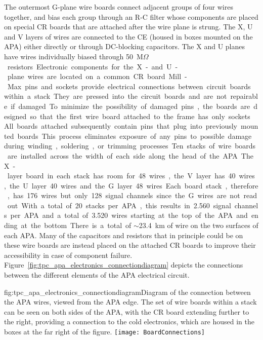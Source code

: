 The outermost G-plane wire boards connect adjacent groups of four wires together, and bias each group through an R-C filter whose components are placed on special CR boards that are attached after the wire plane is strung. The X, U and V layers of wires are connected to the CE (housed in boxes mounted on the APA) either directly or through DC-blocking capacitors. The X and U planes have wires individually biased through \SI{50}{M$\Omega$} resistors. Electronic components for the X- and U-plane wires are located on a common CR board. 

Mill-Max pins and sockets provide electrical connections between circuit boards within a stack. They are pressed into the circuit boards and are not repairable if damaged. To minimize the possibility of damaged pins, the boards are designed so that the first wire board attached to the frame has only sockets. All boards attached subsequently contain pins that plug into previously mounted boards. This process eliminates exposure of any pins to possible damage during winding, soldering, or trimming processes.

Ten stacks of wire boards are installed across the width of each side along the head of the APA.  The X-layer board in each stack has room for 48 wires, the V layer has 40 wires, the U layer 40 wires and the G layer 48 wires.  Each board stack, therefore, has 176 wires but only 128 signal channels since the G wires are not read out. With a total of 20 stacks per APA, this results in \SI{2,560} signal channels per APA and a total of \SI{3,520} wires starting at the top of the APA and ending at the bottom.  There is a total of $\sim$\SI{23.4}{km} of wire on the two surfaces of each APA.  Many of the capacitors and resistors that in principle could be on these wire boards are instead placed on the attached CR boards to improve their accessibility in case of component failure.   Figure~\ref{fig:tpc_apa_electronics_connectiondiagram} depicts the connections between the different elements of the APA electrical circuit. 

\begin{dunefigure}{fig:tpc_apa_electronics_connectiondiagram}{Diagram of the connection between the APA wires, viewed from the APA edge. The set of wire boards within a stack can be seen on both sides of the APA, with the CR board extending further to the right, providing a connection to the cold electronics, which are housed in the boxes at the far right of the figure. }
\texttt{[image: BoardConnections]}
\end{dunefigure} 

